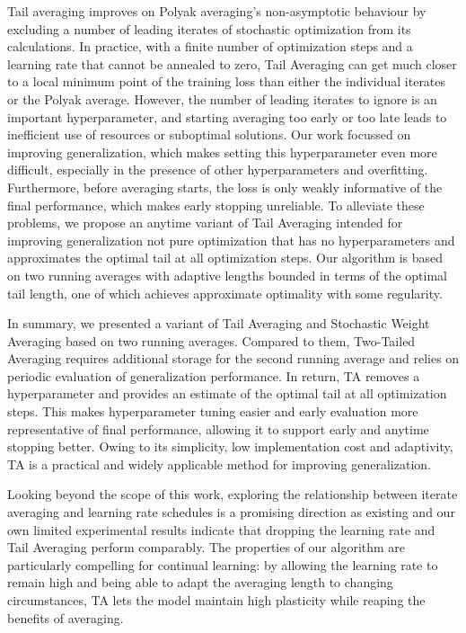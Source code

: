 \documentclass[twocolumn]{article}
\newcommand{\tta}{\liningnums{2}TA}
\begin{document}
Tail averaging improves on Polyak averaging's non-asymptotic behaviour by excluding a number of leading iterates of stochastic optimization from its calculations.
In practice, with a finite number of optimization steps and a learning rate that cannot be annealed to zero, Tail Averaging can get much closer to a local minimum point of the training loss than either the individual iterates or the Polyak average.
However, the number of leading iterates to ignore is an important hyperparameter, and starting averaging too early or too late leads to inefficient use of resources or suboptimal solutions.
Our work focussed on improving generalization, which makes setting this hyperparameter even more difficult, especially in the presence of other hyperparameters and overfitting.
Furthermore, before averaging starts, the loss is only weakly informative of the final performance, which makes early stopping unreliable.
To alleviate these problems, we propose an anytime variant of Tail Averaging intended for improving generalization not pure optimization that has no hyperparameters and approximates the optimal tail at all optimization steps.
Our algorithm is based on two running averages with adaptive lengths bounded in terms of the optimal tail length, one of which achieves approximate optimality with some regularity.

In summary, we presented a variant of Tail Averaging and Stochastic Weight Averaging based on two running averages.
Compared to them, Two-Tailed Averaging requires additional storage for the second running average and relies on periodic evaluation of generalization performance.
In return, \tta{} removes a hyperparameter and provides an estimate of the optimal tail at all optimization steps.
This makes hyperparameter tuning easier and early evaluation more representative of final performance, allowing it to support early and anytime stopping better.
Owing to its simplicity, low implementation cost and adaptivity, \tta{} is a practical and widely applicable method for improving generalization.

Looking beyond the scope of this work, exploring the relationship between iterate averaging and learning rate schedules is a promising direction as existing \citep{merity2017regularizing} and our own limited experimental results indicate that dropping the learning rate and Tail Averaging perform comparably.
The properties of our algorithm are particularly compelling for continual learning: by allowing the learning rate to remain high and being able to adapt the averaging length to changing circumstances, \tta{} lets the model maintain high plasticity while reaping the benefits of averaging.
\end{document}
